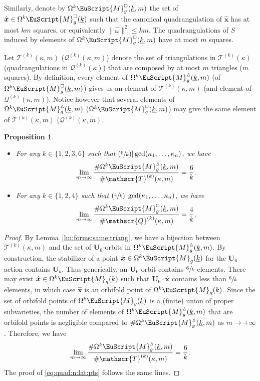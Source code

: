 \documentclass[10pt]{amsart}
\let\mathcal\EuScript
\newcommand{\Psfrac}[2]{(\sfrac{#1}{#2})}
\theoremstyle{plain}
\newtheorem{Proposition}[Theorem]{Proposition}
\theoremstyle{definition}
\newcommand{\Ub}{\mathbf{U}}
\newcommand{\Mcal}{\mathcal{M}}
\newcommand{\QQ}{\mathscr{Q}}
\newcommand{\TT}{\mathscr{T}}
\newcommand{\homg}{\hat{\omega}}
\newcommand{\hxx}{\hat{\boldsymbol{x}}}
\let\ul\underline
\newcommand{\Skdiff}{\Omega^k\mathcal{M}_{g}(\ul{k})}
\newcommand{\Qkdiff}{\Omega^k\Mcal^{\scriptscriptstyle\square}_g(\ul{k})}
\newcommand{\Tkdiffm}{\Omega^k\Mcal^\vartriangle_g(\ul{k},m)}
\newcommand{\Qkdiffm}{\Omega^k\Mcal^{\scriptscriptstyle\square}_g(\ul{k},m)}
\providecommand{\skpt}{\par\smallskip\noindent}
\begin{document}
Similarly, denote by $\Qkdiffm$ the set of $\hxx\in \Qkdiff$ such that the canonical quadrangulation of $\hxx$ has at most $km$ squares, or equivalently $\|\homg\|^2 \leq km$. The quadrangulations of $S$ induced by elements of $\Qkdiffm$ have at most $m$ squares.

Let $\TT^{(k)}(\kappa,m)$ (\resp $\QQ^{(k)}(\kappa,m)$) denote the set of triangulations in $\TT^{(k)}(\kappa)$ (\resp quadrangulations in $\QQ^{(k)}(\kappa)$) that are composed by at most $m$ triangles (\resp $m$ squares). By definition, every element of $\Tkdiffm$ (\resp of~$\Qkdiffm$) gives us an element of $\TT^{(k)}(\kappa,m)$ (\resp and element of $\QQ^{(k)}(\kappa,m)$). Notice however that several elements of $\Tkdiffm$ (\resp $\Qkdiffm$) may give the same element of $\TT^{(k)}(\kappa,m)$ (\resp $\QQ^{(k)}(\kappa,m)$.

\skpt
\begin{Proposition}\label{prop:triang:n:lat:pts}
\begin{itemize}
\item
For any $k \in \{1,2,3,6\}$ such that $\Psfrac{6}{k} | \gcd(\kappa_1,\dots,\kappa_n)$, we have%
\begin{equation}\label{eq:triang:n:lat:pts}
\lim_{m\to \infty}\frac{\#\Tkdiffm}{\#\TT^{(k)}(\kappa,m)}=\frac{6}{k}.
\end{equation}

\item
For any $k\in \{1,2,4\}$ such that $\Psfrac{4}{k} | \gcd(\kappa_1,\dots,\kappa_n)$, we have
\begin{equation}\label{eq:quad:n:lat:pts}
\lim_{m\to \infty}\frac{\#\Qkdiffm}{\#\QQ^{(k)}(\kappa,m)}=\frac{4}{k}.
\end{equation}
\end{itemize}
\end{Proposition}

\begin{proof}
By Lemma~\ref{lm:forms:same:triang}, we have a bijection between $\TT^{(k)}(\kappa,m)$ and the set of $\Ub_6$\nobreakdash-orbits in $\Tkdiffm$.
By construction, the stabilizer of a point $\hxx\in \Skdiff$ for the $\Ub_6$ action contains $\Ub_k$. Thus generically, an $\Ub_6$-orbit contains $\sfrac{6}{k}$ elements. There may exist $\hxx\in \Skdiff$ such that $\Ub_6\cdot\hxx$ contains less than $\sfrac{6}{k}$ elements, in which case $\hxx$ is an orbifold point of $\Skdiff$. Since the set of orbifold points of $\Skdiff$ is a (finite) union of proper subvarieties, the number of elements of $\Tkdiffm$ that are orbifold points is negligible compared to $\#\Tkdiffm$ as $m\to +\infty$. Therefore, we have
\[
\lim_{m\to \infty}\frac{\#\Tkdiffm}{\#\TT^{(k)}(\kappa,m)}=\frac{6}{k}.
\]
The proof of \eqref{eq:quad:n:lat:pts} follows the same lines.
\end{proof}
\end{document}
